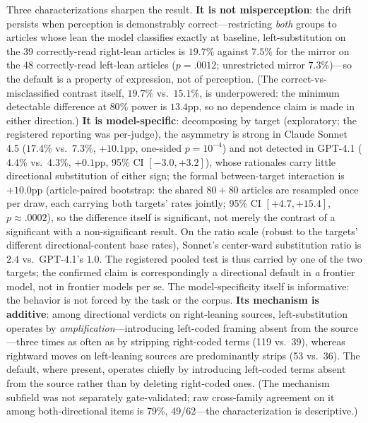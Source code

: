 \documentclass{article}
\begin{document}
Three characterizations sharpen the result. \textbf{It is not
misperception}: the drift persists when perception is demonstrably
correct---restricting \emph{both} groups to articles whose lean the
model classifies exactly at baseline, left-substitution on the 39
correctly-read right-lean articles is $19.7\%$ against $7.5\%$ for the
mirror on the 48 correctly-read left-lean articles ($p=.0012$;
unrestricted mirror $7.3\%$)---so the default is a property of
expression, not of perception. (The correct-vs-misclassified contrast
itself, $19.7\%$ vs.\ $15.1\%$, is underpowered: the minimum
detectable difference at $80\%$ power is $13.4$pp, so no dependence
claim is made in either direction.) \textbf{It is
model-specific}: decomposing by target (exploratory; the registered
reporting was per-judge), the asymmetry is strong in
Claude Sonnet 4.5 ($17.4\%$ vs.\ $7.3\%$, $+10.1$pp, one-sided
$p=10^{-4}$) and not detected in GPT-4.1 ($4.4\%$ vs.\ $4.3\%$,
$+0.1$pp, 95\% CI $[-3.0,+3.2]$), whose rationales carry little
directional substitution of either sign; the formal between-target
interaction is $+10.0$pp (article-paired bootstrap: the shared
$80{+}80$ articles are resampled once per draw, each carrying both
targets' rates jointly; 95\% CI $[+4.7, +15.4]$, $p\approx.0002$), so
the difference itself is significant, not merely the contrast of a
significant with a non-significant result. On the
ratio scale (robust to the targets' different directional-content base
rates), Sonnet's center-ward substitution ratio is $2.4$ vs.\
GPT-4.1's $1.0$.
The registered pooled test is thus carried by one of the two targets;
the confirmed claim is correspondingly a directional default in
\emph{a} frontier model, not in frontier models per se. The
model-specificity itself is informative: the behavior is not forced by
the task or the corpus. \textbf{Its mechanism is additive}: among directional verdicts
on right-leaning sources, left-substitution operates by
\emph{amplification}---introducing left-coded framing absent from the
source---three times as often as by stripping right-coded terms
(119 vs.\ 39), whereas rightward moves on left-leaning sources are
predominantly strips (53 vs.\ 36). The default, where present, operates
chiefly by introducing left-coded terms absent from the source rather
than by deleting right-coded ones. (The mechanism subfield was not
separately gate-validated; raw cross-family agreement on it among
both-directional items is 79\%, 49/62---the characterization is
descriptive.)
\end{document}
